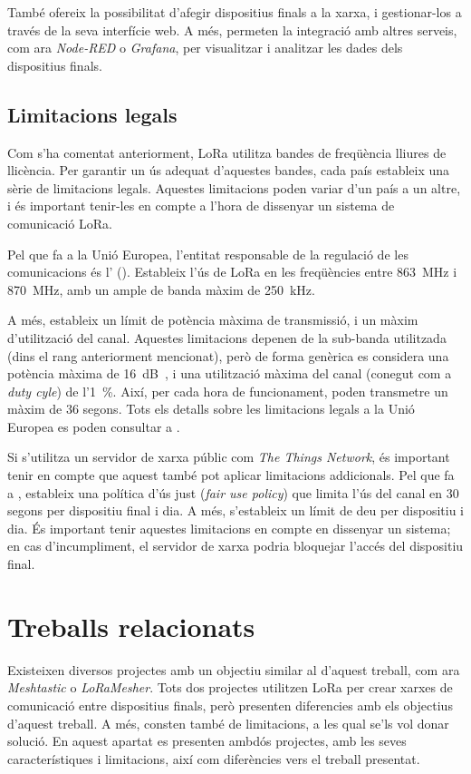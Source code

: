 \documentclass{tfgitic}[2024/07/01]
\begin{document}
També ofereix la possibilitat d'afegir dispositius finals a la xarxa, i gestionar-los a través de la seva interfície web. A més, permeten la integració amb altres serveis, com ara \emph{Node-RED} o \emph{Grafana}, per visualitzar i analitzar les dades dels dispositius finals.

\subsection{Limitacions legals}
\label{subsec:limitacions_legals}
Com s'ha comentat anteriorment, LoRa utilitza bandes de freqüència lliures de llicència. Per garantir un ús adequat d'aquestes bandes, cada país estableix una sèrie de limitacions legals. Aquestes limitacions poden variar d'un país a un altre, i és important tenir-les en compte a l'hora de dissenyar un sistema de comunicació LoRa. 

Pel que fa a la Unió Europea, l'entitat responsable de la regulació de les comunicacions és l' (). Estableix l'ús de LoRa en les freqüències entre \SI{863}{\MHz} i \SI{870}{\MHz}, amb un ample de banda màxim de \SI{250}{\kHz}.

A més, estableix un límit de potència màxima de transmissió, i un màxim d'utilització del canal. Aquestes limitacions depenen de la sub-banda utilitzada (dins el rang anteriorment mencionat), però de forma genèrica es considera una potència màxima de \SI{16}{\deci\bel{}}, i una utilització màxima del canal (conegut com a \emph{duty cyle}) de l'\SI{1}{\%}. Així, per cada hora de funcionament, poden transmetre un màxim de 36 segons. Tots els detalls sobre les limitacions legals a la Unió Europea es poden consultar a \cite{etsi_etsi_nodate}.

Si s'utilitza un servidor de xarxa públic com \emph{The Things Network}, és important tenir en compte que aquest també pot aplicar limitacions addicionals. Pel que fa a , estableix una política d'ús just (\emph{fair use policy}) que limita l'ús del canal en 30 segons per dispositiu final i dia. A més, s'estableix un límit de deu  per dispositiu i dia. És important tenir aquestes limitacions en compte en dissenyar un sistema; en cas d'incumpliment, el servidor de xarxa podria bloquejar l'accés del dispositiu final.

\section{Treballs relacionats}
\label{sec:treballs_relacionats}
Existeixen diversos projectes amb un objectiu similar al d'aquest treball, com ara \emph{Meshtastic} o \emph{LoRaMesher}. Tots dos projectes utilitzen LoRa per crear xarxes de comunicació entre dispositius finals, però presenten diferencies amb els objectius d'aquest treball. A més, consten també de limitacions, a les qual se'ls vol donar solució. En aquest apartat es presenten ambdós projectes, amb les seves característiques i limitacions, així com diferències vers el treball presentat. 
\end{document}
